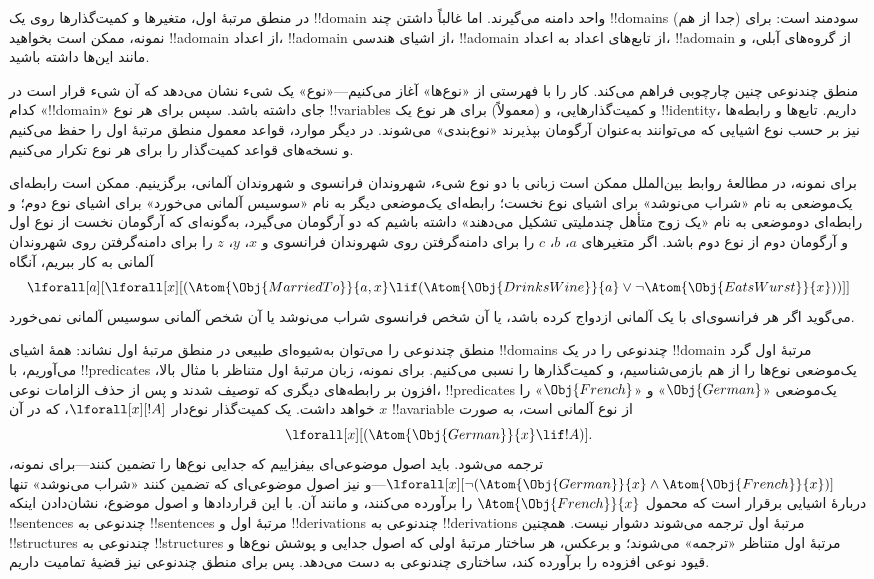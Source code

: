 \documentclass[../../../include/open-logic-section]{subfiles}
\begin{document}


در منطق مرتبهٔ اول، متغیرها و کمیت‌گذارها روی یک !!{domain} واحد
دامنه می‌گیرند. اما غالباً داشتن چند !!{domain}s (جدا از هم) سودمند است:
برای نمونه، ممکن است بخواهید !!a{domain} از اعداد، !!a{domain} از اشیای
هندسی، !!a{domain} از تابع‌های اعداد به اعداد، !!a{domain} از گروه‌های
آبلی، و مانند این‌ها داشته باشید.

منطق چندنوعی چنین چارچوبی فراهم می‌کند. کار را با فهرستی از «نوع‌ها»
آغاز می‌کنیم---«نوع» یک شیء نشان می‌دهد که آن شیء قرار است در کدام
«!!{domain}» جای داشته باشد. سپس برای هر نوع !!{variable}s و
کمیت‌گذارهایی، و (معمولاً) برای هر نوع یک !!{identity}، داریم. تابع‌ها
و رابطه‌ها نیز بر حسب نوع اشیایی که می‌توانند به‌عنوان آرگومان بپذیرند
«نوع‌بندی» می‌شوند. در دیگر موارد، قواعد معمول منطق مرتبهٔ اول را حفظ
می‌کنیم و نسخه‌های قواعد کمیت‌گذار را برای هر نوع تکرار می‌کنیم.

برای نمونه، در مطالعهٔ روابط بین‌الملل ممکن است زبانی با دو نوع شیء،
شهروندان فرانسوی و شهروندان آلمانی، برگزینیم. ممکن است رابطه‌ای
یک‌موضعی به نام «شراب می‌نوشد» برای اشیای نوع نخست؛ رابطه‌ای یک‌موضعی
دیگر به نام «سوسیس آلمانی می‌خورد» برای اشیای نوع دوم؛ و رابطه‌ای
دوموضعی به نام «یک زوج متأهل چندملیتی تشکیل می‌دهند» داشته باشیم که دو
آرگومان می‌گیرد، به‌گونه‌ای که آرگومان نخست از نوع اول و آرگومان دوم از
نوع دوم باشد. اگر متغیرهای $a$، $b$، $c$ را برای دامنه‌گرفتن روی
شهروندان فرانسوی و $x$، $y$، $z$ را برای دامنه‌گرفتن روی شهروندان
آلمانی به کار ببریم، آنگاه
\[
\lforall[a][\lforall[x][(\Atom{\Obj{MarriedTo}}{a,x} \lif
(\Atom{\Obj{DrinksWine}}{a} \lor \lnot \Atom{\Obj{EatsWurst}}{x}))]]
\]
می‌گوید اگر هر فرانسوی‌ای با یک آلمانی ازدواج کرده باشد، یا آن شخص
فرانسوی شراب می‌نوشد یا آن شخص آلمانی سوسیس آلمانی نمی‌خورد.

منطق چندنوعی را می‌توان به‌شیوه‌ای طبیعی در منطق مرتبهٔ اول نشاند:
همهٔ اشیای !!{domain}s چندنوعی را در یک !!{domain} مرتبهٔ اول گرد
می‌آوریم، با !!{predicate}s یک‌موضعی نوع‌ها را از هم بازمی‌شناسیم، و
کمیت‌گذارها را نسبی می‌کنیم. برای نمونه، زبان مرتبهٔ اول متناظر با مثال
بالا، افزون بر رابطه‌های دیگری که توصیف شدند و پس از حذف الزامات نوعی،
!!{predicate}s یک‌موضعی «$\Obj{German}$» و «$\Obj{French}$» را خواهد
داشت. یک کمیت‌گذار نوع‌دار $\lforall[x][!A]$، که در آن $x$
!!a{variable} از نوع آلمانی است، به صورت
\[
\lforall[x][(\Atom{\Obj{German}}{x} \lif !A)].
\]
ترجمه می‌شود. باید اصول موضوعی‌ای بیفزاییم که جدایی نوع‌ها را تضمین
کنند---برای نمونه، $\lforall[x][\lnot (\Atom{\Obj{German}}{x} \land
  \Atom{\Obj{French}}{x})]$---و نیز اصول موضوعی‌ای که تضمین کنند
«شراب می‌نوشد» تنها دربارهٔ اشیایی برقرار است که محمول
$\Atom{\Obj{French}}{x}$ را برآورده می‌کنند، و مانند آن. با این
قراردادها و اصول موضوع، نشان‌دادن اینکه !!{sentence}s چندنوعی به
!!{sentence}s مرتبهٔ اول و !!{derivation}s چندنوعی به
!!{derivation}s مرتبهٔ اول ترجمه می‌شوند دشوار نیست. همچنین
!!{structure}s چندنوعی به !!{structure}s مرتبهٔ اول متناظر «ترجمه»
می‌شوند؛ و برعکس، هر ساختار مرتبهٔ اولی که اصول جدایی و پوشش نوع‌ها و
قیود نوعی افزوده را برآورده کند، ساختاری چندنوعی به دست می‌دهد. پس برای
منطق چندنوعی نیز قضیهٔ تمامیت داریم.
\end{document}
